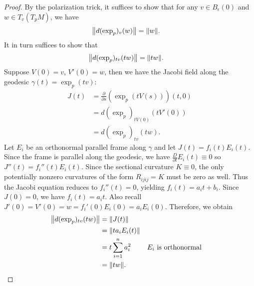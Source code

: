 \documentclass[12pt]{article}
\begin{document}
\begin{proof}
By the polarization trick, it suffices to show that for any $ v \in B_{ \epsilon}(0)$ and $ w \in T_v(T_pM)$, we have
\begin{align*}
	{\left\lVert{ d(\exp_p)_v(w)}\right\rVert} &= {\left\lVert{ w}\right\rVert} .
\end{align*}
It in turn suffices to show that
\begin{align*}
	{\left\lVert{ d(\exp_p)_{tv}(tw)}\right\rVert} &= {\left\lVert{ tw}\right\rVert} .
\end{align*}
Suppose $V(0) =v$,  $ V'(0) = w$, then we have the Jacobi field along the geodesic $ \gamma(t) = \exp_p(tv)$:
 \begin{align*}
	 J(t) &= \frac{\partial }{\partial s} \left( \exp_p (tV(s)) \right)(t,0) \\ 
	 &= d\left( \exp_p \right)_{tV(0)} (tV'(0))  \\
	 &= d\left( \exp_p \right)_{tv} (tw)  .
\end{align*}
Let $ E_i$ be an orthonormal parallel frame along $ \gamma$ and let $ J(t) = f_{i}(t) E_i(t)$. Since the frame is parallel along the geodesic, we have $ \frac{D}{ \partial t} E_i(t) \equiv 0$ so $ J''(t) = f_i''(t) E_i(t)$. Since the sectional curvature $ K \equiv 0$, the only potentially nonzero curvatures of the form $ R_{ijij}= K$ must be zero as well. Thus the Jacobi equation reduces to $ f_i''(t) = 0$, yielding $ f_i(t) = a_i t + b_i$. Since $ J(0) = 0$, we have  $ f_i(t) = a_i t$. Also recall $ J'(0) = V'(0) = w = f_i'(0) E_i(0) = a_i E_i(0)$. Therefore, we obtain
\begin{align*}
	{\left\lVert{ d(\exp_p)_{tv} (tw) }\right\rVert}  &= {\left\lVert{ J(t)}\right\rVert} \\
	&= {\left\lVert{t a_i E_i(t)}\right\rVert}  \\
	&= t \sum_{ i= 1}^{ n} a_i^2 && E_i \text{ is orthonormal} \\
	&= {\left\lVert{ tw}\right\rVert}  .
\end{align*}
\end{proof}
\end{document}
